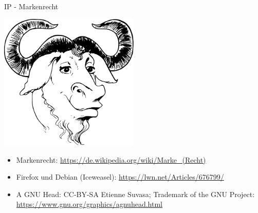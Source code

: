 \begin{frame}{IP - Markenrecht}
	\begin{center}
		\includegraphics[width=0.5\textwidth]{res/gnu-head.pdf}
	\end{center}
\end{frame}
\note
{
	\begin{itemize}
		\item Markenrecht: \url{https://de.wikipedia.org/wiki/Marke_(Recht)}
		\item Firefox und Debian (Iceweasel): \url{https://lwn.net/Articles/676799/}
		\item A GNU Head: CC-BY-SA Etienne Suvasa; Trademark of the GNU Project: \url{https://www.gnu.org/graphics/agnuhead.html}
	\end{itemize}
}


